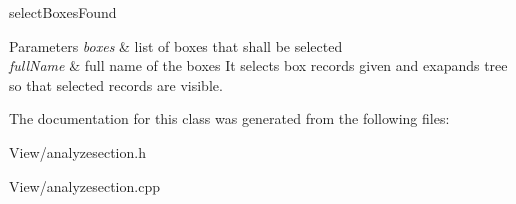 select\-Boxes\-Found 


\begin{DoxyParams}{Parameters}
{\em boxes} & list of boxes that shall be selected \\
\hline
{\em full\-Name} & full name of the boxes It selects box records given and exapands tree so that selected records are visible. \\
\hline
\end{DoxyParams}


The documentation for this class was generated from the following files\-:\begin{DoxyCompactItemize}
\item 
View/analyzesection.\-h\item 
View/analyzesection.\-cpp\end{DoxyCompactItemize}
